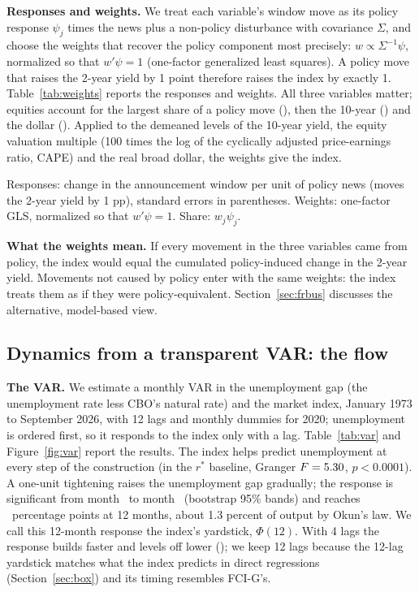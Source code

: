 \documentclass[11pt]{article}
\def\out{../replication/output}
\begin{document}
\textbf{Responses and weights.} We treat each variable's window move as its policy response $\psi_j$ times the news plus a non-policy disturbance with covariance $\Sigma$, and choose the weights that recover the policy component most precisely: $w\propto\Sigma^{-1}\psi$, normalized so that $w'\psi=1$ (one-factor generalized least squares). A policy move that raises the 2-year yield by 1 point therefore raises the index by exactly 1. Table~\ref{tab:weights} reports the responses and weights. All three variables matter; equities account for the largest share of a policy move (\ShareEq), then the 10-year (\ShareTen) and the dollar (\ShareUsd). Applied to the demeaned levels of the 10-year yield, the equity valuation multiple (100 times the log of the cyclically adjusted price-earnings ratio, CAPE) and the real broad dollar, the weights give the index.

\begin{table}[H]\centering\small
\caption{Market index: responses to policy news and weights}\label{tab:weights}

\par\medskip\begin{minipage}{0.92\textwidth}\footnotesize Responses: change in the announcement window per unit of policy news (moves the 2-year yield by 1 pp), standard errors in parentheses. Weights: one-factor GLS, normalized so that $w'\psi=1$. Share: $w_j\psi_j$.\end{minipage}
\end{table}

\textbf{What the weights mean.} If every movement in the three variables came from policy, the index would equal the cumulated policy-induced change in the 2-year yield. Movements not caused by policy enter with the same weights: the index treats them as if they were policy-equivalent. Section~\ref{sec:frbus} discusses the alternative, model-based view.

\subsection{Dynamics from a transparent VAR: the flow}

\textbf{The VAR.} We estimate a monthly VAR in the unemployment gap (the unemployment rate less CBO's natural rate) and the market index, January 1973 to September 2026, with 12 lags and monthly dummies for 2020; unemployment is ordered first, so it responds to the index only with a lag. Table~\ref{tab:var} and Figure~\ref{fig:var} report the results. The index helps predict unemployment at every step of the construction (in the $r^*$ baseline, Granger $F=5.30$, $p<0.0001$). A one-unit tightening raises the unemployment gap gradually; the response is significant from month \SigFromTwelve\ to month \SigToTwelve\ (bootstrap 95\% bands) and reaches \PhiRstarTwelve\ percentage points at 12 months, about 1.3 percent of output by Okun's law. We call this 12-month response the index's yardstick, $\Phi(12)$. With 4 lags the response builds faster and levels off lower (\PhiRstarFour); we keep 12 lags because the 12-lag yardstick matches what the index predicts in direct regressions (Section~\ref{sec:box}) and its timing resembles FCI-G's.
\end{document}
